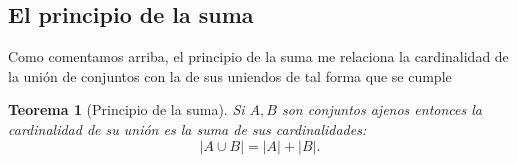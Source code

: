 \documentclass{book}
\newtheorem{thm}{Teorema}[chapter]
\theoremstyle{definition}
\begin{document}
\subsection{El principio de la suma}
Como comentamos arriba, el principio de la suma me relaciona la cardinalidad de la unión de conjuntos con la de sus uniendos de tal forma que se cumple
\begin{thm}[Principio de la suma]
	Si $A,B$ son conjuntos ajenos %
	entonces la cardinalidad de su unión es la suma de sus cardinalidades:
	\[\left|A\cup B\right| = \left| A \right| +\left| B \right|.\]
\end{thm}

















\end{document}
